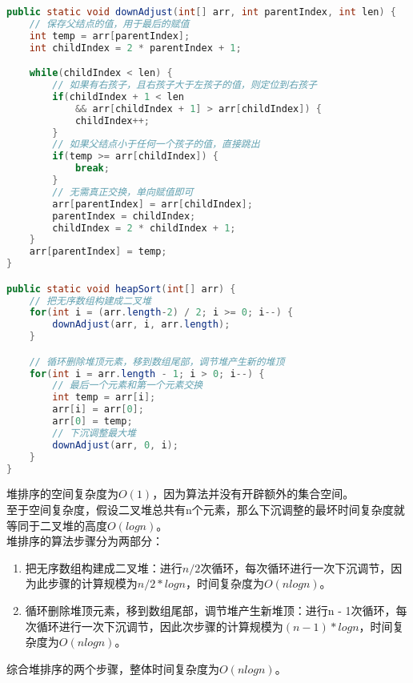 \begin{lstlisting}[language=Java]
public static void downAdjust(int[] arr, int parentIndex, int len) {
    // 保存父结点的值，用于最后的赋值
    int temp = arr[parentIndex];
    int childIndex = 2 * parentIndex + 1;

    while(childIndex < len) {
        // 如果有右孩子，且右孩子大于左孩子的值，则定位到右孩子
        if(childIndex + 1 < len 
            && arr[childIndex + 1] > arr[childIndex]) {
            childIndex++;
        }
        // 如果父结点小于任何一个孩子的值，直接跳出
        if(temp >= arr[childIndex]) {
            break;
        }
        // 无需真正交换，单向赋值即可
        arr[parentIndex] = arr[childIndex];
        parentIndex = childIndex;
        childIndex = 2 * childIndex + 1;
    }
    arr[parentIndex] = temp;
}

public static void heapSort(int[] arr) {
    // 把无序数组构建成二叉堆
    for(int i = (arr.length-2) / 2; i >= 0; i--) {
        downAdjust(arr, i, arr.length);
    }

    // 循环删除堆顶元素，移到数组尾部，调节堆产生新的堆顶
    for(int i = arr.length - 1; i > 0; i--) {
        // 最后一个元素和第一个元素交换
        int temp = arr[i];
        arr[i] = arr[0];
        arr[0] = temp;
        // 下沉调整最大堆
        downAdjust(arr, 0, i);
    }
}
\end{lstlisting}

堆排序的空间复杂度为$ O(1) $，因为算法并没有开辟额外的集合空间。 \\

至于空间复杂度，假设二叉堆总共有n个元素，那么下沉调整的最坏时间复杂度就等同于二叉堆的高度$ O(logn) $。 \\

堆排序的算法步骤分为两部分：

\begin{enumerate}
    \item 把无序数组构建成二叉堆：进行$ n / 2 $次循环，每次循环进行一次下沉调节，因为此步骤的计算规模为$ n/2 * logn $，时间复杂度为$ O(nlogn) $。

    \item 循环删除堆顶元素，移到数组尾部，调节堆产生新堆顶：进行n - 1次循环，每次循环进行一次下沉调节，因此次步骤的计算规模为$ (n-1) * logn $，时间复杂度为$ O(nlogn) $。
\end{enumerate}

综合堆排序的两个步骤，整体时间复杂度为$ O(nlogn) $。

\newpage
